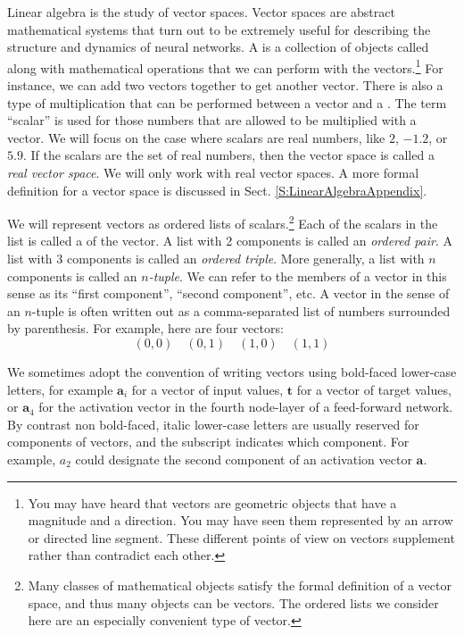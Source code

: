     Linear algebra is the study of vector spaces. Vector spaces are abstract
mathematical systems that turn out to be extremely useful for describing the 
structure and dynamics of neural networks. A  is a 
collection of objects called  along with mathematical 
operations that we can perform with the vectors.\footnote{You may have heard 
that vectors are geometric objects that have a magnitude and a direction. You 
may have seen them represented by an arrow or directed line segment. These 
different points of view on vectors supplement rather than contradict each 
other.}  For instance, we can add two vectors together to get another vector. There is also a type of 
multiplication that can be performed between a vector and a . The term ``scalar'' is used for those numbers that are allowed to be 
multiplied with a vector. We will focus on the case where scalars are real numbers, like $2$, $-1.2$, or $5.9$. If the scalars are the set of real numbers, then the 
vector space is called a {\em real vector space}. We will only work with real
vector spaces. A more formal definition for a vector space is discussed in 
Sect. \ref{S:LinearAlgebraAppendix}. 

We will represent vectors as ordered lists of scalars.\footnote{ Many classes of mathematical objects satisfy the formal definition
of a vector space, and thus many objects can be vectors. The ordered lists we consider here are an especially convenient type of vector.} Each of the scalars in the list is called a  
of the vector. A list with 2 components is called an {\em ordered pair}. A 
list with 3 components is called an {\em ordered triple}. More generally, a
list with $n$ components is called an {\em $n$-tuple}. We can refer to the
members of a vector in this sense  as its ``first component'',  ``second component'', etc.
A vector in the sense of an $n$-tuple is often 
written out as a comma-separated list of numbers surrounded by parenthesis. 
For example, here are four vectors:
\begin{equation*}
    (0,0) \quad (0,1) \quad (1,0) \quad (1,1) 
\end{equation*}

We sometimes adopt the convention of writing vectors using bold-faced lower-case letters, for example $\mathbf{a}_i$ for a  vector of input values, $\mathbf{t}$ for a vector of target values, or $\mathbf{a}_4$ for the activation vector in the fourth node-layer of a feed-forward network.  By contrast non bold-faced, italic lower-case letters are usually reserved for components of vectors, and the subscript indicates which component. For example, $a_2$ could designate the second component of an activation vector $\mathbf{a}$.

